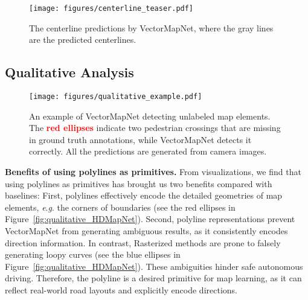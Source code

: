 \documentclass{article}
\newcommand{\eg}{\textit{e}.\textit{g}. }
\theoremstyle{plain}
\theoremstyle{definition}
\theoremstyle{remark}
\begin{document}
\begin{figure}[t]
  \centering
  \texttt{[image: figures/centerline\_teaser.pdf]}
\caption{The centerline predictions by VectorMapNet, where the gray lines are the predicted centerlines.}
  \vspace{-1em}
  \label{fig:centerline_prediction}
\end{figure}





\vspace{-1.em}
\subsection{Qualitative Analysis}
\begin{figure}[!ht]
  \centering
  \texttt{[image: figures/qualitative\_example.pdf]}
\caption{An example of VectorMapNet detecting unlabeled map elements. The \textbf{\textcolor{red}{red ellipses}} indicate two pedestrian crossings that are missing in ground truth annotations, while VectorMapNet detects it correctly. All the predictions are generated from camera images.}
  \label{fig:qualitative_example}
  \vspace{-1em}
\end{figure}

\noindent\textbf{Benefits of using polylines as primitives.}
From visualizations, we find that using polylines as primitives has brought us two benefits compared with baselines: 
First, polylines effectively encode the detailed geometries of map elements, \eg the corners of boundaries (see the red ellipses in Figure~\ref{fig:qualitative_HDMapNet}). 
Second, polyline representations prevent VectorMapNet from generating ambiguous results, as it consistently encodes direction information. In contrast, Rasterized methods are prone to falsely generating loopy curves (see the blue ellipses in Figure~\ref{fig:qualitative_HDMapNet}). These ambiguities hinder safe autonomous driving. 
Therefore, the polyline is a desired primitive for map learning, as it can reflect real-world road layouts and explicitly encode directions.
\end{document}
